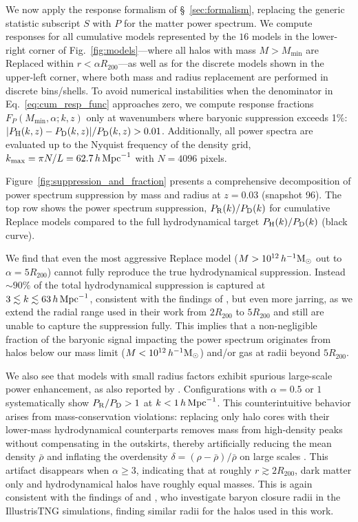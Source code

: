 \documentclass[linenumbers,trackchanges]{aastex701}
\begin{document}
We now apply the response formalism of \S~\ref{sec:formalism}, replacing the generic statistic subscript $S$ with $P$ for the matter power spectrum. We compute responses for all cumulative models represented by the $16$ models in the lower-right corner of Fig.~\ref{fig:models}—where all halos with mass $M > M_{\min}$ are Replaced within $r < \alpha R_{200}$—as well as for the discrete models shown in the upper-left corner, where both mass and radius replacement are performed in discrete bins/shells. To avoid numerical instabilities when the denominator in Eq.~\eqref{eq:cum_resp_func} approaches zero, we compute response fractions $F_P(M_{\min}, \alpha; k, z)$ only at wavenumbers where baryonic suppression exceeds 1\%: $|P_{\rm H}(k,z) - P_{\rm D}(k,z)|/P_{\rm D}(k,z) > 0.01$. Additionally, all power spectra are evaluated up to the Nyquist frequency of the density grid, $k_{\rm max} = \pi N / L = 62.7\,h\,{\rm Mpc}^{-1}$ with $N=4096$ pixels.

Figure~\ref{fig:suppression_and_fraction} presents a comprehensive decomposition of power spectrum suppression by mass and radius at $z=0.03$ (snapshot 96). The top row shows the power spectrum suppression, $P_{\rm R}(k)/P_{\rm D}(k)$ for cumulative Replace models compared to the full hydrodynamical target $P_{\rm H}(k)/P_{\rm D}(k)$ (black curve).

We find that even the most aggressive Replace model ($M > 10^{12}\,h^{-1}{\rm M}_\odot$ out to $\alpha=5R_{200}$) cannot fully reproduce the true hydrodynamical suppression.  Instead $\sim 90\%$ of the total hydrodynamical suppression is captured at $3 \lesssim k \lesssim 63\,h\,{\rm Mpc}^{-1}$, consistent with the findings of \citet{Miller-25}, but even more jarring, as we extend the radial range used in their work from $2R_{200}$ to $5R_{200}$ and still are unable to capture the suppression fully. This implies that a non-negligible fraction of the baryonic signal impacting the power spectrum originates from halos below our mass limit ($M < 10^{12}\,h^{-1}{\rm M}_\odot$) and/or gas at radii beyond $5R_{200}$.

We also see that models with small radius factors exhibit spurious large-scale power enhancement, as also reported by \citet{Miller-25}. Configurations with $\alpha = 0.5$ or $1$ systematically show $P_{\rm R}/P_{\rm D} > 1$ at $k < 1\,h\,{\rm Mpc}^{-1}$. This counterintuitive behavior arises from mass-conservation violations: replacing only halo cores with their lower-mass hydrodynamical counterparts removes mass from high-density peaks without compensating in the outskirts, thereby artificially reducing the mean density $\bar{\rho}$ and inflating the overdensity $\delta = (\rho - \bar{\rho})/\bar{\rho}$ on large scales \citep{Miller-25}. This artifact disappears when $\alpha \geq 3$, indicating that at roughly $r\gtrsim 2R_{200}$, dark matter only and hydrodynamical halos have roughly equal masses. This is again consistent with the findings of \citet{Miller-25} and \citet{Ayromlou23}, who investigate baryon closure radii in the IllustrisTNG simulations, finding similar radii for the halos used in this work.
\end{document}
